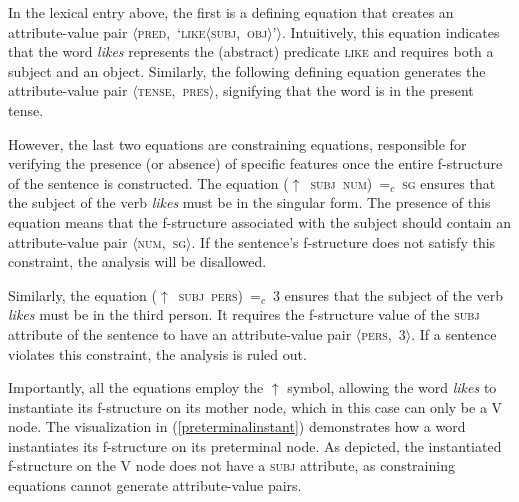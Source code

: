 \begin{sloppypar}

In the lexical entry above, the first is a defining equation that creates an attribute-value pair \mbox{$\langle$\textsc{pred}, `\textsc{like}$\langle$\textsc{subj, obj}$\rangle$'$\rangle$}. Intuitively, this equation indicates that the word \textit{likes} represents the (abstract) predicate \textsc{like} and requires both a subject and an object. Similarly, the following defining equation generates the attribute-value pair \mbox{$\langle$\textsc{tense}, \textsc{pres}$\rangle$}, signifying that the word is in the present tense. 
\end{sloppypar}

However, the last two equations are constraining equations, responsible for verifying the presence (or absence) of specific features once the entire f-structure of the sentence is constructed. The equation \mbox{($\uparrow$ \textsc{subj} \textsc{num}) =$_c$ \textsc{sg}} ensures that the subject of the verb \textit{likes} must be in the singular form. The presence of this equation means that the f-structure associated with the subject should contain an attribute-value pair \mbox{$\langle$\textsc{num}, \textsc{sg}$\rangle$}. If the sentence's f-structure does not satisfy this constraint, the analysis will be disallowed. 


Similarly, the equation \mbox{($\uparrow$ \textsc{subj} \textsc{pers}) =$_c$ 3} ensures that the subject of the verb \textit{likes} must be in the third person. It requires the f-structure value of the \textsc{subj} attribute of the sentence to have an attribute-value pair \mbox{$\langle$\textsc{pers}, 3$\rangle$}. If a sentence violates this constraint, the analysis is ruled out.

Importantly, all the equations employ the $\uparrow$ symbol, allowing the word \textit{likes} to instantiate its f-structure on its mother node, which in this case can only be a V node. The visualization in (\ref{preterminalinstant}) demonstrates how a word instantiates its f-structure on its preterminal node. As depicted, the instantiated f-structure on the V node does not have a \textsc{subj} attribute, as constraining equations cannot generate attribute-value pairs.

\pex
\label{preterminalinstant}
\vspace{-2em}

